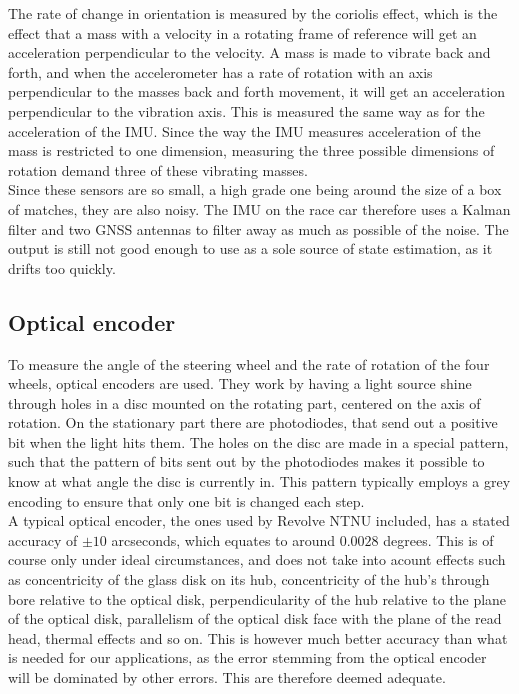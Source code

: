 The rate of change in orientation is measured by the coriolis effect, which is the effect that a mass with a velocity in a rotating frame of reference will get an acceleration perpendicular to the velocity. A mass is made to vibrate back and forth, and when the accelerometer has a rate of rotation  with an axis perpendicular to the masses back and forth movement, it will get an acceleration perpendicular to the vibration axis. This is measured the same way as for the acceleration of the IMU. Since the way the IMU measures acceleration of the mass is restricted to one dimension, measuring the three possible dimensions of rotation demand three of these vibrating masses. \\

Since these sensors are so small, a high grade one being around the size of a box of matches, they are also noisy. The IMU on the race car therefore uses a Kalman filter and two GNSS antennas to filter away as much as possible of the noise. The output is still not good enough to use as a sole source of state estimation, as it drifts too quickly.
\subsection{Optical encoder}
To measure the angle of the steering wheel and the rate of rotation of the four wheels, optical encoders are used. They work by having a light source shine through holes in a disc mounted on the rotating part, centered on the axis of rotation. On the stationary part there are photodiodes, that send out a positive bit when the light hits them. The holes on the disc are made in a special pattern, such that the pattern of bits sent out by the photodiodes makes it possible to know at what angle the disc is currently in. This pattern typically employs a grey encoding to ensure that only one bit is changed each step. \\ 

A typical optical encoder, the ones used by Revolve NTNU included, has a stated accuracy of $\pm 10$ arcseconds, which equates to around $0.0028$ degrees. This is of course only under ideal circumstances, and does not take into acount effects such as concentricity of the glass disk on its hub, concentricity of the hub’s through bore relative to the optical disk, perpendicularity of the hub relative to the plane of the optical disk, parallelism of the optical disk face with the plane of the read head, thermal effects and so on. This is however much better accuracy than what is needed for our applications, as the error stemming from the optical encoder will be dominated by other errors. This are therefore deemed adequate.

